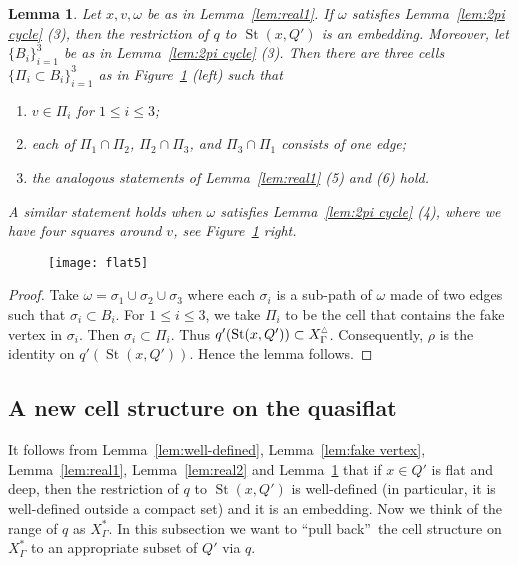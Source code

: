 \documentclass[11pt]{amsart}
\newcommand{\St}{\operatorname{St}}
\newtheorem{lemma}[theorem]{Lemma}
\theoremstyle{definition}
\newcommand{\Xa}{X^{\ast}}
\newcommand{\Xb}{X^{\scalebox{0.53}{$\triangle$}}}
\begin{document}
\begin{lemma}
\label{lem:real3}
Let $x,v,\omega$ be as in Lemma~\ref{lem:real1}. If $\omega$ satisfies Lemma~\ref{lem:2pi cycle} (3), then the restriction of $q$ to $\St(x,Q')$ is an embedding. Moreover, let $\{B_i\}_{i=1}^3$ be as in  Lemma~\ref{lem:2pi cycle} (3). Then there are three cells $\{\Pi_i\subset B_i\}_{i=1}^3$ as in Figure~\ref{f:flat5} (left) such that
\begin{enumerate}
	\item $v\in\Pi_i$ for $1\le i\le 3$;
	\item each of $\Pi_1\cap\Pi_2$, $\Pi_2\cap\Pi_3$, and $\Pi_3\cap\Pi_1$ consists of one edge;
	\item the analogous statements of Lemma~\ref{lem:real1} (5) and (6) hold.
\end{enumerate}
A similar statement holds when $\omega$ satisfies Lemma~\ref{lem:2pi cycle} (4), where we have four squares around $v$, see Figure~\ref{f:flat5} right.
\end{lemma}

\begin{figure}[h!]
	\centering
	\texttt{[image: flat5]}
	\caption{}
	\label{f:flat5}
\end{figure}

\begin{proof}
Take $\omega=\sigma_1\cup\sigma_2\cup\sigma_3$ where each $\sigma_i$ is a sub-path of $\omega$ made of two edges such that $\sigma_i\subset B_i$. For $1\le i\le 3$, we take $\Pi_i$ to be the cell that contains the fake vertex in $\sigma_i$. Then $\sigma_i\subset\Pi_i$. Thus $q'(\St(x,Q'))\subset\Xb_{\Gamma}$. Consequently, $\rho$ is the identity on $q'(\St(x,Q'))$. Hence the lemma follows.
\end{proof}

\subsection{A new cell structure on the quasiflat}
\label{subsec:new cell structure}
It follows from Lemma~\ref{lem:well-defined}, Lemma~\ref{lem:fake vertex}, Lemma~\ref{lem:real1}, Lemma~\ref{lem:real2} and Lemma~\ref{lem:real3} that if $x\in Q'$ is flat and deep, then the restriction of $q$ to $\St(x,Q')$ is well-defined (in particular, it is well-defined outside a compact set) and it is an embedding. Now we think of the range of $q$ as $\Xa_\Gamma$. In this subsection we want to \textquotedblleft pull back\textquotedblright\ the cell structure on $\Xa_\Gamma$ to an appropriate subset of $Q'$ via $q$.
\end{document}
